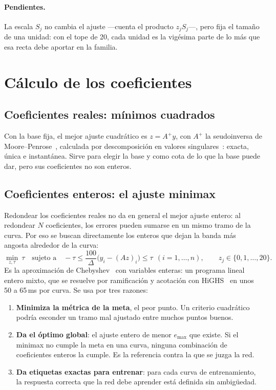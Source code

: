 \paragraph{Pendientes.} La escala $S_j$ no cambia el ajuste ---cuenta el producto $z_jS_j$---, pero fija el tamaño de una unidad: con el tope de 20, cada unidad es la vigésima parte de lo más que esa recta debe aportar en la familia.

\section{Cálculo de los coeficientes}
\subsection{Coeficientes reales: mínimos cuadrados}
Con la base fija, el mejor ajuste cuadrático es $z=A^+y$, con $A^+$ la seudoinversa de Moore--Penrose~\cite{penrose}, calculada por descomposición en valores singulares~\cite{golub}: exacta, única e instantánea. Sirve para elegir la base y como cota de lo que la base puede dar, pero sus coeficientes no son enteros.

\subsection{Coeficientes enteros: el ajuste minimax}
Redondear los coeficientes reales no da en general el mejor ajuste entero: al redondear $N$ coeficientes, los errores pueden sumarse en un mismo tramo de la curva. Por eso se buscan directamente los enteros que dejan la banda más angosta alrededor de la curva:
\begin{equation}\label{eq:minimax}
\min_{z,\tau}\ \tau\quad\text{sujeto a}\quad -\tau\le\frac{100}{\Delta}\bigl(y_i-(Az)_i\bigr)\le\tau\ \ (i=1,\ldots,n),\qquad z_j\in\{0,1,\ldots,20\}.
\end{equation}
Es la aproximación de Chebyshev~\cite{cheney} con variables enteras: un programa lineal entero mixto, que se resuelve por ramificación y acotación con HiGHS~\cite{highs} en unos 50 a 65\,ms por curva. Se usa por tres razones:
\begin{enumerate}[label=(\roman*)]
\item \textbf{Minimiza la métrica de la meta}, el peor punto. Un criterio cuadrático podría esconder un tramo mal ajustado entre muchos puntos buenos.
\item \textbf{Da el óptimo global}: el ajuste entero de menor $e_{\max}$ que existe. Si el minimax no cumple la meta en una curva, ninguna combinación de coeficientes enteros la cumple. Es la referencia contra la que se juzga la red.
\item \textbf{Da etiquetas exactas para entrenar}: para cada curva de entrenamiento, la respuesta correcta que la red debe aprender está definida sin ambigüedad.
\end{enumerate}


